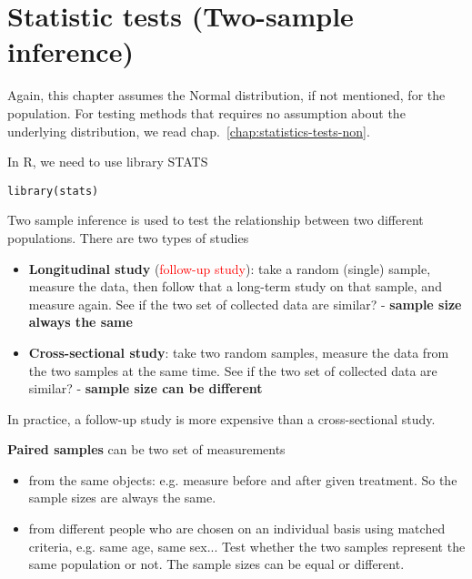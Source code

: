 
\chapter{Statistic tests (Two-sample inference)}
\label{chap:statistic-tests-two}

Again, this chapter assumes the Normal distribution, if not
mentioned, for the population. For testing methods that requires no assumption
about the underlying distribution, we read
chap.~\ref{chap:statistics-tests-non}.

\begin{framed}
  In R, we need to use library STATS
\begin{lstlisting}
library(stats)
\end{lstlisting}
\end{framed}

Two sample inference is used to test the relationship between two
different populations. There are two types of studies
\begin{itemize}
\item {\bf Longitudinal study} (\textcolor{red}{follow-up study}):
  take a random (single) sample, measure the data, then follow that a
  long-term study on that sample, and measure again. See if the two
  set of collected data are similar?  -
  {\bf sample size always the same}

\item {\bf Cross-sectional study}: take two random samples, measure
  the data from the two samples at the same time. See if the two set
  of collected data are similar? - {\bf sample size can be different}
\end{itemize}

\begin{framed}
  In practice, a follow-up study is more expensive than a
  cross-sectional study.
\end{framed}


{\bf Paired samples} can be two set of measurements
\begin{itemize}
\item from the same objects: e.g. measure before and after given treatment. So
the sample sizes are always the same.

\item from different people who are chosen on an individual basis
  using matched criteria, e.g. same age, same sex... Test whether the two
  samples represent the same population or not. The sample sizes can be equal or
  different.
\end{itemize}

